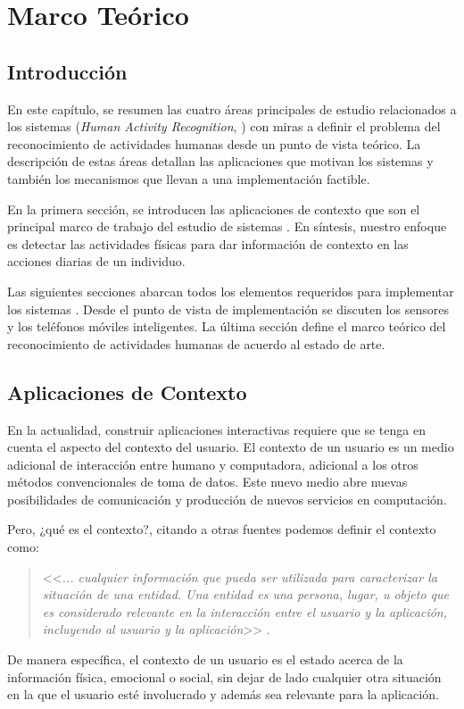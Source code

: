 
\chapter{Marco Teórico}

\label{chap2:marco-teorico}

\section{Introducción}

\label{sec21:introduccion}En este capítulo, se resumen las cuatro
áreas principales de estudio relacionados a los sistemas (\emph{Human
Activity Recognition}, ) con miras a definir el problema
del reconocimiento de actividades humanas desde un punto de vista
teórico. La descripción de estas áreas detallan las aplicaciones que
motivan los sistemas  y también los mecanismos que llevan
a una implementación factible. 

En la primera sección, se introducen las aplicaciones de contexto
que son el principal marco de trabajo del estudio de sistemas .
En síntesis, nuestro enfoque es detectar las actividades físicas para
dar información de contexto en las acciones diarias de un individuo. 

Las siguientes secciones abarcan todos los elementos requeridos para
implementar los sistemas . Desde el punto de vista de implementación
se discuten los sensores y los teléfonos móviles inteligentes. La
última sección define el marco teórico del reconocimiento de actividades
humanas de acuerdo al estado de arte.

\section{Aplicaciones de Contexto}

\label{sec22:contexto}En la actualidad, construir aplicaciones interactivas
requiere que se tenga en cuenta el aspecto del contexto del usuario.
El contexto de un usuario es un medio adicional de interacción entre
humano y computadora, adicional a los otros métodos convencionales
de toma de datos. Este nuevo medio abre nuevas posibilidades de comunicación
y producción de nuevos servicios en computación. 

Pero, ¿qué es el contexto?, citando a otras fuentes podemos definir
el contexto como: 
\begin{quotation}
<<\emph{... cualquier información que pueda ser utilizada para caracterizar
la situación de una entidad. Una entidad es una persona, lugar, u
objeto que es considerado relevante en la interacción entre el usuario
y la aplicación, incluyendo al usuario y la aplicación}>> \cite{Dey2000}. 
\end{quotation}
De manera específica, el contexto de un usuario es el estado acerca
de la información física, emocional o social, sin dejar de lado cualquier
otra situación en la que el usuario esté involucrado y además sea
relevante para la aplicación.

